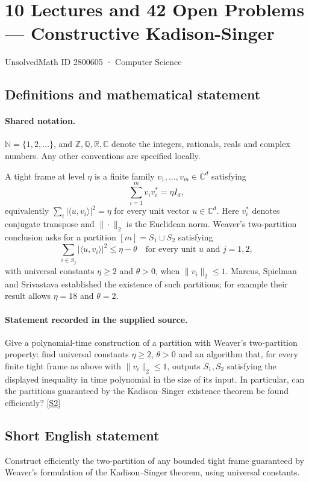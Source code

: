 \documentclass[11pt]{article}
\newcommand{\sref}[2]{\hyperlink{source:#1:#2}{[S#2]}}
\begin{document}
\setcounter{section}{2800604}
\section{10 Lectures and 42 Open Problems — Constructive Kadison-Singer}\label{2800605}
{\small\sffamily UnsolvedMath ID 2800605 · Computer Science}
\subsection{Definitions and mathematical statement}

\paragraph{Shared notation.}$\mathbb N=\{1,2,\ldots\}$, and $\mathbb Z,\mathbb Q,\mathbb R,\mathbb C$ denote the integers, rationals, reals and complex numbers. Any other conventions are specified locally.


A tight frame at level \(\eta\) is a finite family \(v_1,\ldots,v_m\in\mathbb C^d\) satisfying
\[\sum_{i=1}^m v_i v_i^*=\eta I_d,\]
equivalently \(\sum_i|\langle u,v_i\rangle|^2=\eta\) for every unit vector \(u\in\mathbb C^d\). Here \(v_i^*\) denotes conjugate transpose and \(\|\cdot\|_2\) is the Euclidean norm. Weaver's two-partition conclusion asks for a partition \([m]=S_1\sqcup S_2\) satisfying
\[\sum_{i\in S_j}|\langle u,v_i\rangle|^2\le\eta-\theta
\quad\text{for every unit }u\text{ and }j=1,2,\]
with universal constants \(\eta\ge2\) and \(\theta>0\), when \(\|v_i\|_2\le1\). Marcus, Spielman and Srivastava established the existence of such partitions; for example their result allows \(\eta=18\) and \(\theta=2\).
\paragraph{Statement recorded in the supplied source.}
Give a polynomial-time construction of a partition with Weaver's two-partition property: find universal constants \(\eta\ge2\), \(\theta>0\) and an algorithm that, for every finite tight frame as above with \(\|v_i\|_2\le1\), outputs \(S_1,S_2\) satisfying the displayed inequality in time polynomial in the size of its input. In particular, can the partitions guaranteed by the Kadison--Singer existence theorem be found efficiently? \sref{2800605}{2}
\subsection{Short English statement}
Construct efficiently the two-partition of any bounded tight frame guaranteed by Weaver’s formulation of the Kadison–Singer theorem, using universal constants.
\end{document}

